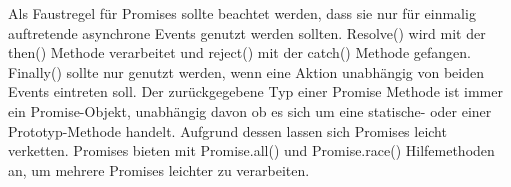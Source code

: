 \noindent
Als Faustregel für Promises sollte beachtet werden, dass sie nur für einmalig auftretende asynchrone Events genutzt werden sollten. Resolve() wird mit der then() Methode verarbeitet und reject() mit der catch() Methode gefangen. Finally() sollte nur genutzt werden, wenn eine Aktion unabhängig von beiden Events eintreten soll. Der zurückgegebene Typ einer Promise Methode ist immer ein Promise-Objekt, unabhängig davon ob es sich um eine statische- oder einer Prototyp-Methode handelt. Aufgrund dessen lassen sich Promises leicht verketten. Promises bieten mit Promise.all() und Promise.race() Hilfemethoden an, um mehrere Promises leichter zu verarbeiten.




